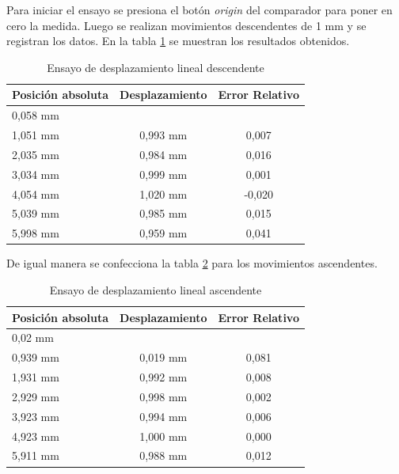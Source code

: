 Para iniciar el ensayo se presiona el botón \textit{origin} del comparador para poner en cero la medida. Luego se realizan movimientos descendentes de 1 mm y se registran los datos.
En la tabla \ref{tab:ensayo_desplazamiento_des} se muestran los resultados obtenidos.

\begin{table}[h!]
	\centering
	\caption[Ensayo de desplazamiento descendente]{Ensayo de desplazamiento lineal descendente}
	\begin{tabular}{l c c }    
		\toprule
		\textbf{Posición absoluta}     & \textbf{Desplazamiento} & \textbf{Error Relativo} \\
		\midrule
		0,058 mm	& 	        	& 	 			 	\\		
		1,051 mm    & 	0,993 mm    	& 	0,007				\\
		2,035 mm 	& 	0,984 mm	    & 	0,016 				\\
		3,034 mm	& 	0,999 mm	    & 	0,001 			\\
		4,054 mm 	& 	1,020 mm         & 	-0,020					\\
		5,039 mm 	& 	0,985 mm	    & 	0,015					\\
		5,998 mm 	& 	0,959 mm        & 	0,041 			\\
		\bottomrule
		\hline
	\end{tabular}
	\label{tab:ensayo_desplazamiento_des}
\end{table}

De igual manera se confecciona la tabla \ref{tab:ensayo_desplazamiento_asc} para los movimientos ascendentes.
 
\begin{table}[h!]
	\centering
	\caption[Ensayo de desplazamiento ascendente]{Ensayo de desplazamiento lineal ascendente}
	\begin{tabular}{l c c }    
		\toprule
		\textbf{Posición absoluta}     & \textbf{Desplazamiento} & \textbf{Error Relativo} \\
		\midrule
		0,02 mm	& 	        	& 	 			 	\\		
		0,939 mm    & 	0,019 mm    	& 	0,081	\\
		1,931 mm 	& 	0,992 mm	    & 	0,008 	\\
		2,929 mm	& 	0,998 mm	    & 	0,002 	\\
		3,923 mm 	& 	0,994 mm        & 	0,006	\\
		4,923 mm 	& 	1,000 mm	    & 	0,000		\\
		5,911 mm 	& 	0,988 mm        & 	0,012 	\\
		\bottomrule
		\hline
	\end{tabular}
	\label{tab:ensayo_desplazamiento_asc}
\end{table}


